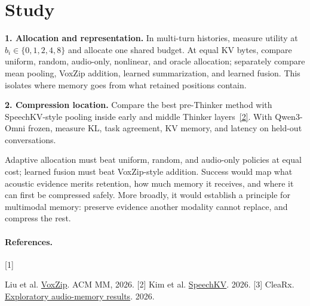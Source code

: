 \documentclass{article}
\begin{document}
\section{Study}

\textbf{1. Allocation and representation.} In multi-turn histories, measure utility at \(b_i\in\{0,1,2,4,8\}\) and allocate one shared budget. At equal KV bytes, compare uniform, random, audio-only, nonlinear, and oracle allocation; separately compare mean pooling, VoxZip addition, learned summarization, and learned fusion. This isolates where memory goes from what retained positions contain.

\textbf{2. Compression location.} Compare the best pre-Thinker method with SpeechKV-style pooling inside early and middle Thinker layers~\hyperlink{ref:speechkv}{[2]}. With Qwen3-Omni frozen, measure KL, task agreement, KV memory, and latency on held-out conversations.

Adaptive allocation must beat uniform, random, and audio-only policies at equal cost; learned fusion must beat VoxZip-style addition. Success would map what acoustic evidence merits retention, how much memory it receives, and where it can first be compressed safely. More broadly, it would establish a principle for multimodal memory: preserve evidence another modality cannot replace, and compress the rest.

{\small\paragraph{References.}
\hypertarget{ref:voxzip}{[1]} Liu et al. \href{https://arxiv.org/html/2608.08569v1}{VoxZip}. ACM MM, 2026.
\quad \hypertarget{ref:speechkv}{[2]} Kim et al. \href{https://arxiv.org/html/2607.06827v1}{SpeechKV}. 2026.
\quad \hypertarget{ref:clearx}{[3]} CleaRx. \href{https://github.com/pvd232/CleaRx/tree/main/experiments}{Exploratory audio-memory results}. 2026.}
\end{document}
